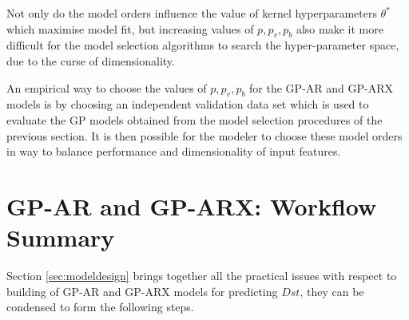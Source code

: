 \documentclass{article}
\begin{document}
Not only do the model orders influence the value of kernel hyperparameters $\theta^*$ which maximise model fit, but increasing values of $p, p_v, p_b$ also make it more difficult for the model selection algorithms to search the hyper-parameter space, due to the curse of dimensionality.

An empirical way to choose the values of $p, p_v, p_b$ for the GP-AR and GP-ARX models is by choosing an independent validation data set which is used to evaluate the GP models obtained from the model selection procedures of the previous section. It is then possible for the modeler to choose these model orders in way to balance performance and dimensionality of input features.

\section{GP-AR and GP-ARX: Workflow Summary}\label{sec:workflow}

Section \ref{sec:modeldesign} brings together all the practical issues with respect to building of GP-AR and GP-ARX models for predicting $Dst$, they can be condensed to form the following steps.
\end{document}
